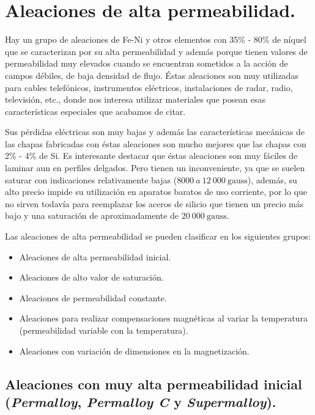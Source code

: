 \documentclass[12pt,a4paper]{article}
\begin{document}
\section{Aleaciones de alta permeabilidad.}

Hay un grupo de aleaciones de Fe-Ni y otros elementos con 35\% - 80\% de níquel que se caracterizan por su alta permeabilidad y además porque tienen valores de permeabilidad muy elevados cuando se encuentran sometidos a la acción de campos débiles, de baja densidad de flujo. Éstas aleaciones son muy utilizadas para cables telefónicos, instrumentos eléctricos, instalaciones de radar, radio, televisión, etc., donde nos interesa utilizar materiales que posean esas características especiales que acabamos de citar.

Sus pérdidas eléctricas son muy bajas y además las características mecánicas de las chapas fabricadas con éstas aleaciones son mucho mejores que las chapas con 2\% - 4\% de Si. Es interesante destacar que éstas aleaciones son muy fáciles de laminar aun en perfiles delgados. Pero tienen un inconveniente, ya que se suelen saturar con indicaciones relativamente bajas ($8000\ a\ 12\ 000\ \mathrm{gauss}$), además, su alto precio impide su utilización en aparatos baratos de uso corriente, por lo que no sirven todavía para reemplazar los aceros de silicio que tienen un precio más bajo y una saturación de aproximadamente de $20\ 000\ \mathrm{gauss}$.

Las aleaciones de alta permeabilidad se pueden clasificar en los siguientes grupos:

\begin{itemize}
    \item Aleaciones de alta permeabilidad inicial.
    \item Aleaciones de alto valor de saturación.
    \item Aleaciones de permeabilidad constante.
    \item Aleaciones para realizar compensaciones magnéticas al variar la temperatura (permeabilidad variable con la temperatura).
    \item Aleaciones con variación de dimensiones en la magnetización.
\end{itemize}

\subsection{Aleaciones con muy alta permeabilidad inicial (\textit{Permalloy}, \textit{Permalloy C} y \textit{Supermalloy}).}
\end{document}
